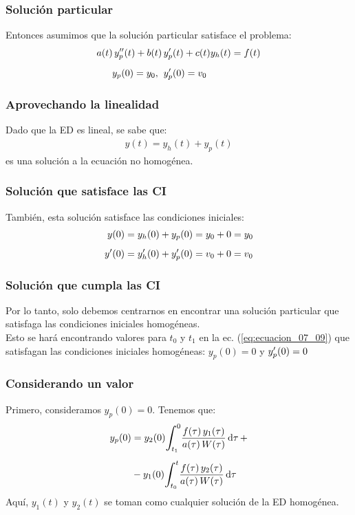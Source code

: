 \documentclass[12pt]{beamer}
\begin{document}
\begin{frame}
\frametitle{Solución particular}
Entonces asumimos que la solución particular satisface el problema:
\pause
\begin{eqnarray}
\begin{aligned}
a (t) \, {y}^{\prime \prime}_{p} (t) + b (t) \, &{y}^{\prime}_{p} (t) + c (t) y_{h} (t) = f (t) \\[0.5em]
y_{p} (0) = y_{0}, \hspace{0.2cm} &{y}^{\prime}_{p} (0) = v_{0}
\end{aligned}
\label{eq:ecuacion_07_14}
\end{eqnarray}
\end{frame}
\begin{frame}
\frametitle{Aprovechando la linealidad}
Dado que la ED es lineal, se sabe que:
\pause
\begin{align*}
y (t) = y_{h} (t) + y_{p} (t)
\end{align*}
es una solución a la ecuación no homogénea.
\end{frame}
\begin{frame}
\frametitle{Solución que satisface las CI}
También, esta solución satisface las condiciones iniciales:
\pause
\begin{align*}
y (0) &= y_{h} (0) + y_{p} (0) = y_{0} + 0 = y_{0} \\[0.5em]
{y}^{\prime} (0) &= {y}^{\prime}_{h} (0) + {y}^{\prime}_{p} (0) = v_{0} + 0 = v_{0}
\end{align*}
\end{frame}
\begin{frame}
\frametitle{Solución que cumpla las CI}
Por lo tanto, solo debemos centrarnos en encontrar una solución particular que satisfaga las condiciones iniciales homogéneas.
\\
\bigskip
\pause
Esto se hará encontrando valores para $t_{0}$ y $t_{1}$ en la ec. (\ref{eq:ecuacion_07_09}) que satisfagan las condiciones iniciales homogéneas: $y_{p} (0) = 0$ y ${y}^{\prime}_{p} (0) = 0$
\end{frame}
\begin{frame}
\frametitle{Considerando un valor}
Primero, consideramos $y_{p} (0) = 0$. \pause Tenemos que:
\pause
\begin{eqnarray}
\begin{aligned}
y_{p} (0) &= y_{2} (0) \scaleint{6ex}_{\bs t_{1}}^{0} \dfrac{f (\tau) \, y_{1} (\tau)}{a (\tau) \, W (\tau)} \dd{\tau} + \\[0.5em]
&- y_{1} (0) \scaleint{6ex}_{\bs t_{0}}^{t} \dfrac{f (\tau) \, y_{2} (\tau)}{a (\tau) \, W (\tau)} \dd{\tau}
\end{aligned}
\label{eq:ecuacion_07_15}
\end{eqnarray}
Aquí, $y_{1} (t)$ y $y_{2} (t)$ se toman como cualquier solución de la ED homogénea.
\end{frame}
\end{document}
